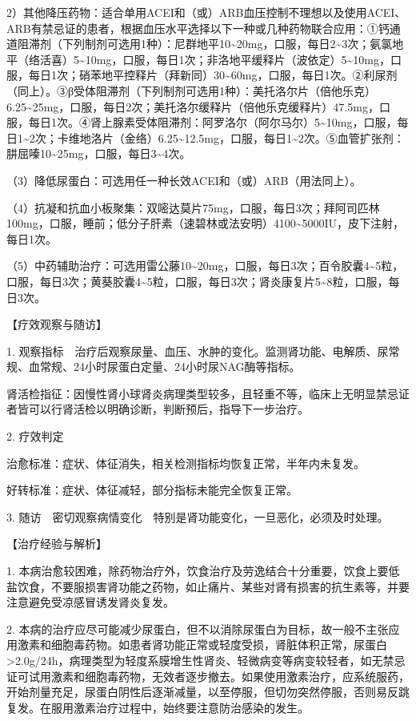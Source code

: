 2）其他降压药物：适合单用ACEI和（或）ARB血压控制不理想以及使用ACEI、ARB有禁忌证的患者，根据血压水平选择以下一种或几种药物联合应用：①钙通道阻滞剂（下列制剂可选用1种）：尼群地平10\textasciitilde{}20mg，口服，每日2\textasciitilde{}3次；氨氯地平（络活喜）5\textasciitilde{}10mg，口服，每日1次；非洛地平缓释片（波依定）5\textasciitilde{}10mg，口服，每日1次；硝苯地平控释片（拜新同）30\textasciitilde{}60mg，口服，每日1次。②利尿剂（同上）。③β受体阻滞剂（下列制剂可选用1种）：美托洛尔片（倍他乐克）6.25\textasciitilde{}25mg，口服，每日2次；美托洛尔缓释片（倍他乐克缓释片）47.5mg，口服，每日1次。④肾上腺素受体阻滞剂：阿罗洛尔（阿尔马尔）5\textasciitilde{}10mg，口服，每日1\textasciitilde{}2次；卡维地洛片（金络）6.25\textasciitilde{}12.5mg，口服，每日1\textasciitilde{}2次。⑤血管扩张剂：肼屈嗪10\textasciitilde{}25mg，口服，每日3\textasciitilde{}4次。

（3）降低尿蛋白：可选用任一种长效ACEI和（或）ARB（用法同上）。

（4）抗凝和抗血小板聚集：双嘧达莫片75mg，口服，每日3次；拜阿司匹林100mg，口服，睡前；低分子肝素（速碧林或法安明）4100\textasciitilde{}5000IU，皮下注射，每日1次。

（5）中药辅助治疗：可选用雷公藤10\textasciitilde{}20mg，口服，每日3次；百令胶囊4\textasciitilde{}5粒，口服，每日3次；黄葵胶囊4\textasciitilde{}5粒，口服，每日3次；肾炎康复片5\textasciitilde{}8粒，口服，每日3次。

【疗效观察与随访】

1.
观察指标　治疗后观察尿量、血压、水肿的变化。监测肾功能、电解质、尿常规、血常规、24小时尿蛋白定量、24小时尿NAG酶等指标。

肾活检指征：因慢性肾小球肾炎病理类型较多，且轻重不等，临床上无明显禁忌证者皆可以行肾活检以明确诊断，判断预后，指导下一步治疗。

2. 疗效判定

治愈标准：症状、体征消失，相关检测指标均恢复正常，半年内未复发。

好转标准：症状、体征减轻，部分指标未能完全恢复正常。

3. 随访　密切观察病情变化　特别是肾功能变化，一旦恶化，必须及时处理。

【治疗经验与解析】

1.
本病治愈较困难，除药物治疗外，饮食治疗及劳逸结合十分重要，饮食上要低盐饮食，不要服损害肾功能之药物，如止痛片、某些对肾有损害的抗生素等，并要注意避免受凉感冒诱发肾炎复发。

2.
本病的治疗应尽可能减少尿蛋白，但不以消除尿蛋白为目标，故一般不主张应用激素和细胞毒药物。如患者肾功能正常或轻度受损，肾脏体积正常，尿蛋白\textgreater{}2.0g/24h，病理类型为轻度系膜增生性肾炎、轻微病变等病变较轻者，如无禁忌证可试用激素和细胞毒药物，无效者逐步撤去。如果使用激素治疗，应系统服药，开始剂量充足，尿蛋白阴性后逐渐减量，以至停服，但切勿突然停服，否则易反跳复发。在服用激素治疗过程中，始终要注意防治感染的发生。

